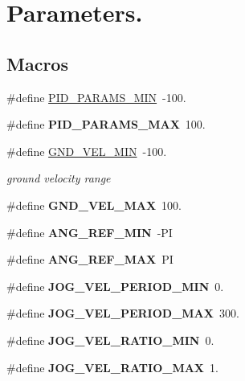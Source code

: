 \hypertarget{group__PID}{}\section{Parameters.}
\label{group__PID}
\subsection*{Macros}
\begin{DoxyCompactItemize}
\item 
\#define \hyperlink{group__PID_ga4be32ff6d05de23e51a9522a957ad8e1}{P\+I\+D\+\_\+\+P\+A\+R\+A\+M\+S\+\_\+\+M\+IN}~-\/100.
\item 
\#define {\bfseries P\+I\+D\+\_\+\+P\+A\+R\+A\+M\+S\+\_\+\+M\+AX}~100.\hypertarget{group__PID_ga478fdd2dc25abd291844a4d46bc7dcc0}{}\label{group__PID_ga478fdd2dc25abd291844a4d46bc7dcc0}

\item 
\#define \hyperlink{group__PID_gabeb0e6ae46e7ac60f0e5436251fd97ed}{G\+N\+D\+\_\+\+V\+E\+L\+\_\+\+M\+IN}~-\/100.
\begin{DoxyCompactList}\small\item\em ground velocity range \end{DoxyCompactList}\item 
\#define {\bfseries G\+N\+D\+\_\+\+V\+E\+L\+\_\+\+M\+AX}~100.\hypertarget{group__PID_ga5ba2fb8e5013dabc20ac2bb3a22fcba2}{}\label{group__PID_ga5ba2fb8e5013dabc20ac2bb3a22fcba2}

\item 
\#define {\bfseries A\+N\+G\+\_\+\+R\+E\+F\+\_\+\+M\+IN}~-\/PI\hypertarget{group__PID_ga3b21706f92009f48e7a1961ed3c07a5a}{}\label{group__PID_ga3b21706f92009f48e7a1961ed3c07a5a}

\item 
\#define {\bfseries A\+N\+G\+\_\+\+R\+E\+F\+\_\+\+M\+AX}~PI\hypertarget{group__PID_ga2ec3fe374445e3be72fdda22c1c25207}{}\label{group__PID_ga2ec3fe374445e3be72fdda22c1c25207}

\item 
\#define {\bfseries J\+O\+G\+\_\+\+V\+E\+L\+\_\+\+P\+E\+R\+I\+O\+D\+\_\+\+M\+IN}~0.\hypertarget{group__PID_gaf2c0f269052c0dcb9d19cd28bc6b7bab}{}\label{group__PID_gaf2c0f269052c0dcb9d19cd28bc6b7bab}

\item 
\#define {\bfseries J\+O\+G\+\_\+\+V\+E\+L\+\_\+\+P\+E\+R\+I\+O\+D\+\_\+\+M\+AX}~300.\hypertarget{group__PID_ga0d3f966f028dfb9bf30edff2bd2c483a}{}\label{group__PID_ga0d3f966f028dfb9bf30edff2bd2c483a}

\item 
\#define {\bfseries J\+O\+G\+\_\+\+V\+E\+L\+\_\+\+R\+A\+T\+I\+O\+\_\+\+M\+IN}~0.\hypertarget{group__PID_gac64aaf9c6b74b781a923fe003badfbf8}{}\label{group__PID_gac64aaf9c6b74b781a923fe003badfbf8}

\item 
\#define {\bfseries J\+O\+G\+\_\+\+V\+E\+L\+\_\+\+R\+A\+T\+I\+O\+\_\+\+M\+AX}~1.\hypertarget{group__PID_ga465b957f2178c656a987943a98ae1c57}{}\label{group__PID_ga465b957f2178c656a987943a98ae1c57}

\end{DoxyCompactItemize}
